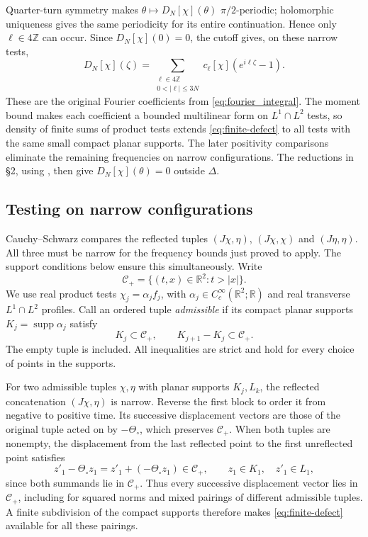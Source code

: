 \documentclass[11pt, letterpaper, reqno]{amsart}
\theoremstyle{definition}
\theoremstyle{remark}
\newcommand{\bbR}{\mathbb{R}}
\newcommand{\bbZ}{\mathbb{Z}}
\newcommand{\calC}{\mathcal{C}}
\begin{document}
Quarter-turn symmetry makes $\theta\mapsto D_N[\chi](\theta)$
$\pi/2$-periodic;
holomorphic uniqueness gives the same periodicity for its entire
continuation. Hence only $\ell\in4\bbZ$ can occur. Since
$D_N[\chi](0)=0$, the cutoff gives, on these narrow tests,
\begin{equation}\label{eq:finite-defect}
 D_N[\chi](\zeta)
 =\sum_{\substack{\ell\in4\bbZ\\0<|\ell|\le3N}}
     c_\ell[\chi](e^{i\ell\zeta}-1).
\end{equation}
These are the original Fourier coefficients from
\eqref{eq:fourier_integral}. The moment bound makes each coefficient
a bounded multilinear form on $L^1\cap L^2$ tests, so density of finite sums
of product tests extends
\eqref{eq:finite-defect} to all tests with the same small compact planar
supports. The later positivity comparisons eliminate the remaining
frequencies on narrow configurations. The reductions in \S2, using
, then give $D_N[\chi](\theta)=0$ outside $\Delta$.


\subsection{Testing on narrow configurations}\label{subsec:narrow-testing}

Cauchy--Schwarz compares the reflected tuples $(J\chi,\eta)$,
$(J\chi,\chi)$ and $(J\eta,\eta)$. All three must be narrow for the
frequency bounds just proved to apply. The support conditions below
ensure this simultaneously. Write
\begin{equation}
 \calC_+=\{(t,x)\in\bbR^2:t>|x|\}.
\end{equation}
We use real product tests $\chi_j=\alpha_jf_j$, with
$\alpha_j\in C_c^\infty(\bbR^2;\bbR)$ and real transverse
$L^1\cap L^2$ profiles. Call an ordered tuple \emph{admissible} if its
compact planar supports $K_j=\operatorname{supp}\alpha_j$ satisfy
\begin{equation}\label{eq:admissible-supports}
 K_j\subset\calC_+,\qquad K_{j+1}-K_j\subset\calC_+.
\end{equation}
The empty tuple is included. All inequalities are strict and hold
for every choice of points in the supports.

For two admissible tuples $\chi,\eta$ with planar supports $K_j,L_k$,
the reflected concatenation
$(J\chi,\eta)$ is narrow. Reverse the first block to order it from
negative to positive time. Its successive displacement vectors are
those of the original tuple acted on by $-\Theta_\circ$, which
preserves $\calC_+$. When both tuples are nonempty, the displacement
from the last reflected point to the first unreflected point satisfies
\begin{equation}\label{eq:narrow-crossing}
 z'_1-\Theta_\circ z_1=z'_1+(-\Theta_\circ z_1)\in\calC_+,
 \qquad z_1\in K_1,\quad z'_1\in L_1,
\end{equation}
since both summands lie in $\calC_+$. Thus every successive
displacement vector lies in $\calC_+$, including for squared norms and mixed pairings
of different admissible tuples. A finite subdivision of the compact
supports therefore makes \eqref{eq:finite-defect} available for
all these pairings.
\end{document}

